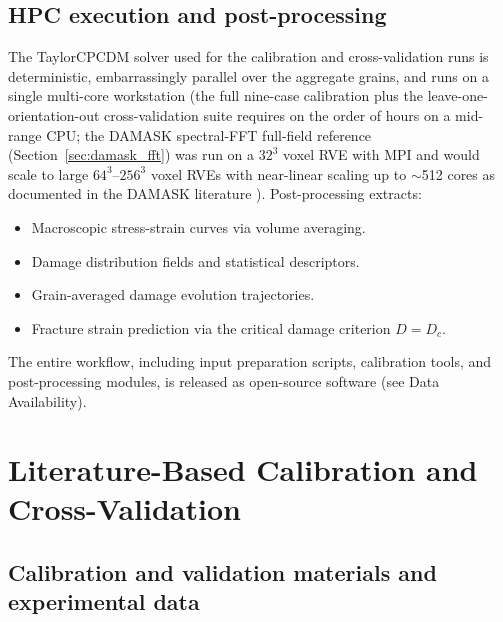 \documentclass[twocolumn]{sagej}
\begin{document}
\subsection{HPC execution and post-processing}

The TaylorCPCDM solver used for the calibration and cross-validation runs is deterministic, embarrassingly parallel over the aggregate grains, and runs on a single multi-core workstation (the full nine-case calibration plus the leave-one-orientation-out cross-validation suite requires on the order of hours on a mid-range CPU; the DAMASK spectral-FFT full-field reference (Section~\ref{sec:damask_fft}) was run on a $32^3$ voxel RVE with MPI and would scale to large $64^3$--$256^3$ voxel RVEs with near-linear scaling up to $\sim$512 cores as documented in the DAMASK literature \cite{roters2019damask}).
Post-processing extracts:

\begin{itemize}
    \item Macroscopic stress-strain curves via volume averaging.
    \item Damage distribution fields and statistical descriptors.
    \item Grain-averaged damage evolution trajectories.
    \item Fracture strain prediction via the critical damage criterion $D = D_c$.
\end{itemize}

The entire workflow, including input preparation scripts, calibration tools, and post-processing modules, is released as open-source software (see Data Availability).

\section{Literature-Based Calibration and Cross-Validation}
\label{sec:validation}

\subsection{Calibration and validation materials and experimental data}
\end{document}
